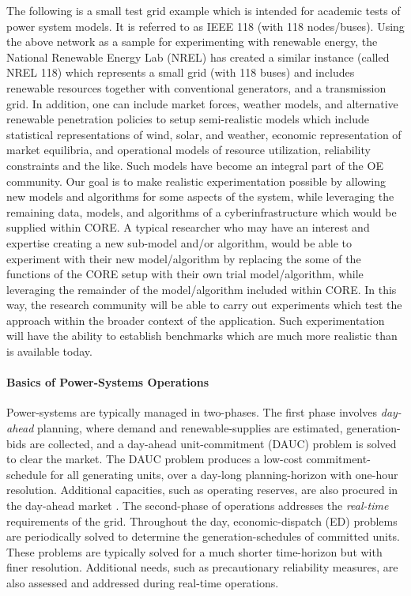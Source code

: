 \documentclass[11pt,a4paper]{article}
\begin{document}
The following is a small test grid example which is intended for academic tests of power system models. It is referred to as IEEE 118 (with 118 nodes/buses). Using the above network as a sample for experimenting with renewable energy, the National Renewable Energy Lab (NREL) has created a similar instance (called NREL 118) which represents a small grid (with 118 buses) and includes renewable resources together with conventional generators, and a transmission grid.  In addition, one can include market forces, weather models, and alternative renewable penetration policies to setup semi-realistic models which include statistical representations of wind, solar, and weather, economic representation of market equilibria, and operational models of resource utilization, reliability constraints and the like.  Such models have become an integral part of the OE community.  Our goal is to make realistic experimentation possible by allowing new models and algorithms for some aspects of the system, while leveraging the remaining data, models, and algorithms of a cyberinfrastructure which would be supplied within CORE.   A typical researcher who may  have an interest and expertise creating a new sub-model and/or algorithm, would be able to experiment with their new model/algorithm  by replacing the some of the functions of the CORE setup with their own trial  model/algorithm, while leveraging the remainder of the model/algorithm included within CORE.  In this way, the research community will be able to carry out experiments which test the approach within the broader context of the application.  Such experimentation will have the ability to establish benchmarks which are much more realistic than is available today. 

\paragraph{Basics of Power-Systems Operations}
Power-systems are typically managed in two-phases. The first phase involves \emph{day-ahead} planning, where demand and renewable-supplies are estimated, generation-bids are collected, and a day-ahead unit-commitment (DAUC) problem is solved to clear the market. The DAUC problem produces a low-cost commitment-schedule for all generating units, over a day-long planning-horizon with one-hour resolution. Additional capacities, such as operating reserves, are also procured in the day-ahead market \citep{Doherty2005, Morales2009}. The second-phase of operations addresses the \emph{real-time} requirements of the grid. Throughout the day, economic-dispatch (ED) problems are periodically solved to determine the generation-schedules of committed units. These problems are typically solved for a much shorter time-horizon but with finer resolution. Additional needs, such as precautionary reliability measures, are also assessed and addressed during real-time operations. 
\end{document}
